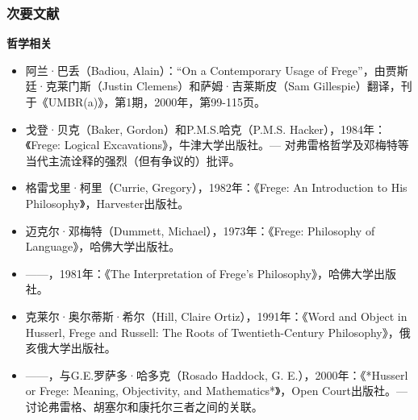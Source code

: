 \subsubsection{次要文献}  
\textbf{哲学相关} 
\begin{itemize}
\item 阿兰·巴丢（Badiou, Alain）：“On a Contemporary Usage of Frege”，由贾斯廷·克莱门斯（Justin Clemens）和萨姆·吉莱斯皮（Sam Gillespie）翻译，刊于《UMBR(a)》，第1期，2000年，第99-115页。  
\item 戈登·贝克（Baker, Gordon）和P.M.S.哈克（P.M.S. Hacker），1984年：《Frege: Logical Excavations》，牛津大学出版社。— 对弗雷格哲学及邓梅特等当代主流诠释的强烈（但有争议的）批评。  
\item 格雷戈里·柯里（Currie, Gregory），1982年：《Frege: An Introduction to His Philosophy》，Harvester出版社。  
\item 迈克尔·邓梅特（Dummett, Michael），1973年：《Frege: Philosophy of Language》，哈佛大学出版社。  
\item ——，1981年：《The Interpretation of Frege's Philosophy》，哈佛大学出版社。  
\item 克莱尔·奥尔蒂斯·希尔（Hill, Claire Ortiz），1991年：《Word and Object in Husserl, Frege and Russell: The Roots of Twentieth-Century Philosophy》，俄亥俄大学出版社。  
\item ——，与G.E.罗萨多·哈多克（Rosado Haddock, G. E.），2000年：《*Husserl or Frege: Meaning, Objectivity, and Mathematics*》，Open Court出版社。— 讨论弗雷格、胡塞尔和康托尔三者之间的关联。

\end{itemize}